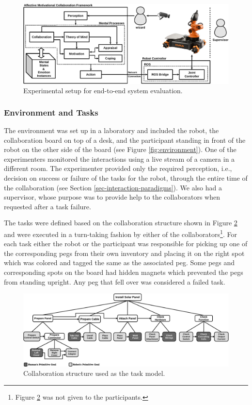 \documentclass[12pt]{report}
\begin{document}
\begin{figure}[t]
  \centering
  \includegraphics[width=\textwidth]{figure/framework-croped.pdf}
  \caption{Experimental setup for end-to-end system evaluation.}
  \label{fig:framework}
\end{figure}

\subsubsection{Environment and Tasks}

The environment was set up in a laboratory and included the robot, the
collaboration board on top of a desk, and the participant standing in front of
the robot on the other side of the board (see Figure \ref{fig:environment}). One
of the experimenters monitored the interactions using a live stream of a camera
in a different room. The experimenter provided only the required perception,
i.e., decision on success or failure of the tasks for the robot, through the
entire time of the collaboration (see Section \ref{sec-interaction-paradigms}).
We also had a supervisor, whose purpose was to provide help to the
collaborators when requested after a task failure.

The tasks were defined based on the collaboration structure shown in Figure
\ref{fig:collaboration_structure} and were executed in a turn-taking fashion by
either of the collaborators\footnote{Figure
\ref{fig:collaboration_structure} was not given to the participants.}. For each
task either the robot or the participant was responsible for picking up one of
the corresponding pegs from their own inventory and placing it on the right spot
which was colored and tagged the same as the associated peg. Some pegs and
corresponding spots on the board had hidden magnets which prevented the pegs
from standing upright. Any peg that fell over was considered a failed task.

\begin{figure}[t]
  \centering
  \includegraphics[width=1\textwidth]{figure/collaborationStructure-croped.pdf}
  \caption{Collaboration structure used as the task model.}
  \label{fig:collaboration_structure}
\end{figure}
\end{document}
